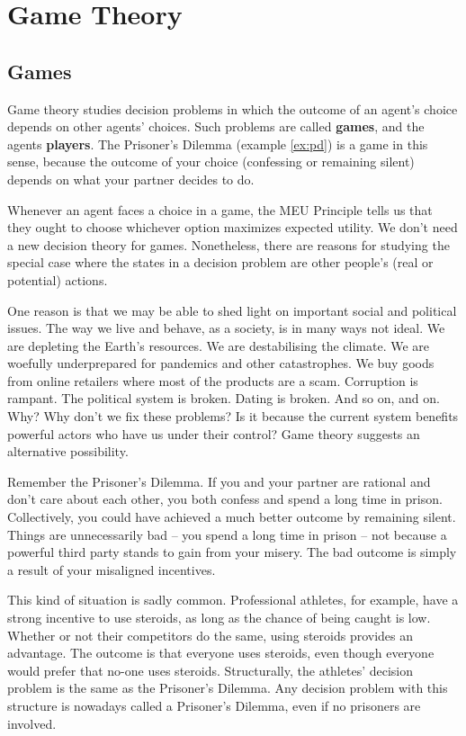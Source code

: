 \chapter{Game Theory}\label{ch:gametheory}

\section{Games}\label{sec:games}

Game theory studies decision problems in which the outcome of an agent's choice
depends on other agents' choices. Such problems are called \textbf{games}, and
the agents \textbf{players}. The Prisoner's Dilemma (example \ref{ex:pd}) is a
game in this sense, because the outcome of your choice (confessing or remaining
silent) depends on what your partner decides to do.

Whenever an agent faces a choice in a game, the MEU Principle tells us that they
ought to choose whichever option maximizes expected utility. We don't need a new
decision theory for games. Nonetheless, there are reasons for studying the
special case where the states in a decision problem are other people's (real or
potential) actions.

One reason is that we may be able to shed light on important social and
political issues. The way we live and behave, as a society, is in many ways not
ideal. We are depleting the Earth's resources. We are destabilising the climate.
We are woefully underprepared for pandemics and other catastrophes. We buy goods
from online retailers where most of the products are a scam. Corruption is
rampant. The political system is broken. Dating is broken. And so on, and on.
Why? Why don't we fix these problems? Is it because the current system benefits
powerful actors who have us under their control? Game theory suggests an
alternative possibility.

Remember the Prisoner's Dilemma. If you and your partner are rational and don't
care about each other, you both confess and spend a long time in prison.
Collectively, you could have achieved a much better outcome by remaining silent.
Things are unnecessarily bad -- you spend a long time in prison -- not because a
powerful third party stands to gain from your misery. The bad outcome is simply
a result of your misaligned incentives.

This kind of situation is sadly common. Professional athletes, for example, have
a strong incentive to use steroids, as long as the chance of being caught is
low. Whether or not their competitors do the same, using steroids provides an
advantage. The outcome is that everyone uses steroids, even though everyone
would prefer that no-one uses steroids. Structurally, the athletes' decision
problem is the same as the Prisoner's Dilemma. Any decision problem with this
structure is nowadays called a Prisoner's Dilemma, even if no prisoners are
involved.

